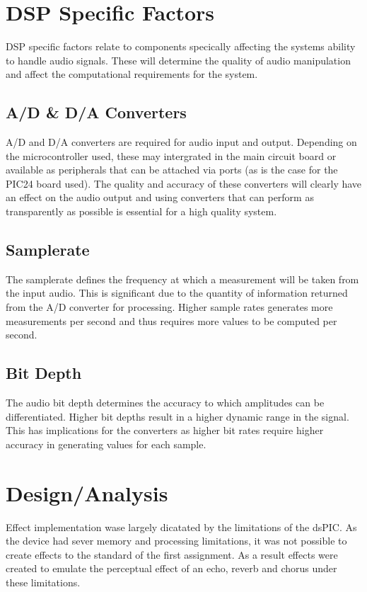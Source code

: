 \documentclass{scrartcl}
\begin{document}
    \section{DSP Specific Factors}
    DSP specific factors relate to components specically affecting the systems
    ability to handle audio signals. These will determine the quality of audio
    manipulation and affect the computational requirements for the system.

    \subsection{A/D \& D/A Converters}
    A/D and D/A converters are required for audio input and output. Depending
    on the microcontroller used, these may intergrated in the main circuit
    board or available as peripherals that can be attached via ports (as is the
    case for the PIC24 board used). The quality and accuracy of these
    converters will clearly have an effect on the audio output and using
    converters that can perform as transparently as possible is essential for a
    high quality system.
    
    \subsection{Samplerate}
    The samplerate defines the frequency at which a measurement will be taken
    from the input audio. This is significant due to the quantity of
    information returned from the A/D converter for processing. Higher sample
    rates generates more measurements per second and thus requires more values
    to be computed per second.

    \subsection{Bit Depth}
    The audio bit depth determines the accuracy to which amplitudes can be
    differentiated. Higher bit depths result in a higher dynamic range in the
    signal. This has implications for the converters as higher bit rates
    require higher accuracy in generating values for each sample.

    \section{Design/Analysis}
    Effect implementation wase largely dicatated by the limitations of the
    dsPIC. As the device had sever memory and processing limitations, it was
    not possible to create effects to the standard of the first assignment. As
    a result effects were created to emulate the perceptual effect of an echo,
    reverb and chorus under these limitations.
\end{document}
